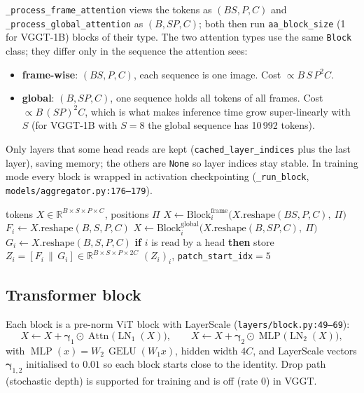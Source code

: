 \documentclass[11pt,a4paper]{article}
\newcommand{\src}[1]{\texttt{\small #1}}
\begin{document}
\texttt{\_process\_frame\_attention} views the tokens as $(BS, P, C)$ and \texttt{\_process\_global\_attention} as $(B, SP, C)$;
both then run \texttt{aa\_block\_size} (1 for VGGT-1B) blocks of their type. The two attention types use the same
\texttt{Block} class; they differ only in the sequence the attention sees:
\begin{itemize}[nosep]
  \item \textbf{frame-wise}: $(BS, P, C)$, each sequence is one image. Cost $\propto B\,S\,P^2 C$.
  \item \textbf{global}: $(B, SP, C)$, one sequence holds all tokens of all frames. Cost $\propto B\,(SP)^2 C$, which is
        what makes inference time grow super-linearly with $S$ (for VGGT-1B with $S=8$ the global sequence has 10\,992 tokens).
\end{itemize}
Only layers that some head reads are kept (\texttt{cached\_layer\_indices} plus the last layer), saving memory; the others
are \texttt{None} so layer indices stay stable. In training mode every block is wrapped in activation checkpointing
(\texttt{\_run\_block}, \src{models/aggregator.py:176--179}).

\begin{algorithm}[htbp]
\caption{Alternating-Attention aggregator}
\begin{algorithmic}[1]
\Require tokens $X\in\mathbb{R}^{B\times S\times P\times C}$, positions $\Pi$
  \State $X \gets \mathrm{Block}^{\text{frame}}_i\big(X.\mathrm{reshape}(BS, P, C),\ \Pi\big)$ 
  \State $F_i \gets X.\mathrm{reshape}(B,S,P,C)$
  \State $X \gets \mathrm{Block}^{\text{global}}_i\big(X.\mathrm{reshape}(B, SP, C),\ \Pi\big)$ 
  \State $G_i \gets X.\mathrm{reshape}(B,S,P,C)$
  \State \textbf{if} $i$ is read by a head \textbf{then} store $Z_i = [F_i \,\|\, G_i] \in \mathbb{R}^{B\times S\times P\times 2C}$
\EndFor
\State \Return $(Z_i)_i$, \texttt{patch\_start\_idx}$=5$
\end{algorithmic}
\end{algorithm}

\subsection{Transformer block}

Each block is a pre-norm ViT block with LayerScale (\src{layers/block.py:49--69}):
\[
  X \leftarrow X + \bm\gamma_1 \odot \operatorname{Attn}\!\big(\operatorname{LN}_1(X)\big),\qquad
  X \leftarrow X + \bm\gamma_2 \odot \operatorname{MLP}\!\big(\operatorname{LN}_2(X)\big),
\]
with $\operatorname{MLP}(x) = W_2\,\operatorname{GELU}(W_1 x)$, hidden width $4C$, and LayerScale vectors
$\bm\gamma_{1,2}$ initialised to $0.01$ so each block starts close to the identity. Drop path (stochastic depth) is
supported for training and is off (rate 0) in VGGT.
\end{document}
